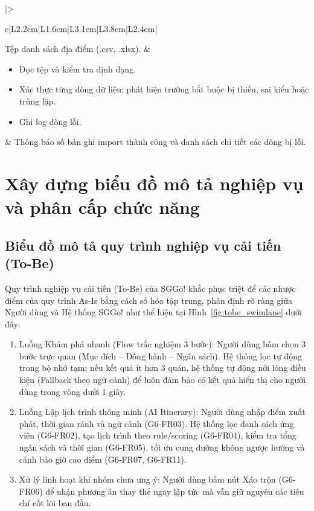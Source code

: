 \documentclass[13pt,a4paper]{extreport}
\begin{document}
\begin{longtable}{|>{\raggedright\arraybackslash}c|L{2.2cm}|L{1.6cm}|L{3.1cm}|L{3.8cm}|L{2.4cm}|}
Tệp danh sách địa điểm (.csv, .xlsx). &
\begin{itemize}[leftmargin=0.4cm,nosep]
    \item Đọc tệp và kiểm tra định dạng.
    \item Xác thực từng dòng dữ liệu: phát hiện trường bắt buộc bị thiếu, sai kiểu hoặc trùng lặp.
    \item Ghi log dòng lỗi.
\end{itemize} &
Thông báo số bản ghi import thành công và danh sách chi tiết các dòng bị lỗi. \\
\end{longtable}

\section{Xây dựng biểu đồ mô tả nghiệp vụ và phân cấp chức năng}

\subsection{Biểu đồ mô tả quy trình nghiệp vụ cải tiến (To-Be)}
Quy trình nghiệp vụ cải tiến (To-Be) của SGGo! khắc phục triệt để các nhược điểm của quy trình As-Is bằng cách số hóa tập trung, phân định rõ ràng giữa Người dùng và Hệ thống SGGo! như thể hiện tại Hình~\ref{fig:tobe_swimlane} dưới đây:

\begin{enumerate}
    \item Luồng Khám phá nhanh (Flow trắc nghiệm 3 bước): Người dùng bấm chọn 3 bước trực quan (Mục đích -- Đồng hành -- Ngân sách). Hệ thống lọc tự động trong bộ nhớ tạm; nếu kết quả ít hơn 3 quán, hệ thống tự động nới lỏng điều kiện (Fallback theo ngữ cảnh) để luôn đảm bảo có kết quả hiển thị cho người dùng trong vòng dưới 1 giây.
    \item Luồng Lập lịch trình thông minh (AI Itinerary): Người dùng nhập điểm xuất phát, thời gian rảnh và ngữ cảnh (G6-FR03). Hệ thống lọc danh sách ứng viên (G6-FR02), tạo lịch trình theo rule/scoring (G6-FR04), kiểm tra tổng ngân sách và thời gian (G6-FR05), tối ưu cung đường không ngược hướng và cảnh báo giờ cao điểm (G6-FR07, G6-FR11).
    \item Xử lý linh hoạt khi nhóm chưa ưng ý: Người dùng bấm nút Xáo trộn (G6-FR06) để nhận phương án thay thế ngay lập tức mà vẫn giữ nguyên các tiêu chí cốt lõi ban đầu.
\end{enumerate}
\end{document}
